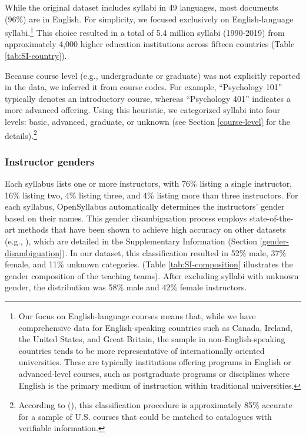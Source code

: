\documentclass[
  british,
  11pt,
]{article}
\begin{document}
While the original dataset includes syllabi in 49 languages, most documents (96\%) are in English. For simplicity, we focused exclusively on English-language syllabi.\footnote{
  Our focus on English-language courses means that, while we have comprehensive data for English-speaking countries such as Canada, Ireland, the United States, and Great Britain, the sample in non-English-speaking countries tends to be more representative of internationally oriented universities. These are typically institutions offering programs in English or advanced-level courses, such as postgraduate programs or disciplines where English is the primary medium of instruction within traditional universities.} This choice resulted in a total of 5.4 million syllabi (1990-2019) from approximately 4,000 higher education institutions across fifteen countries (Table \ref{tab:SI-country}).

Because course level (e.g., undergraduate or graduate) was not explicitly reported in the data, we inferred it from course codes. For example, ``Psychology 101'' typically denotes an introductory course, whereas ``Psychology 401'' indicates a more advanced offering. Using this heuristic, we categorized syllabi into four levels: basic, advanced, graduate, or unknown (see Section \ref{course-level} for the details).\footnote{
  According to (), this classification procedure is approximately 85\% accurate for a sample of U.S. courses that could be matched to catalogues with verifiable information.}

\subsubsection{Instructor genders}\label{instructor-genders}

Each syllabus lists one or more instructors, with 76\% listing a single instructor, 16\% listing two, 4\% listing three, and 4\% listing more than three instructors. For each syllabus, OpenSyllabus automatically determines the instructors' gender based on their names. This gender disambiguation process employs state-of-the-art methods that have been shown to achieve high accuracy on other datasets (e.g., ), which are detailed in the Supplementary Information (Section \ref{gender-disambiguation}). In our dataset, this classification resulted in 52\% male, 37\% female, and 11\% unknown categories. (Table \ref{tab:SI-composition} illustrates the gender composition of the teaching teams). After excluding syllabi with unknown gender, the distribution was 58\% male and 42\% female instructors.
\end{document}

